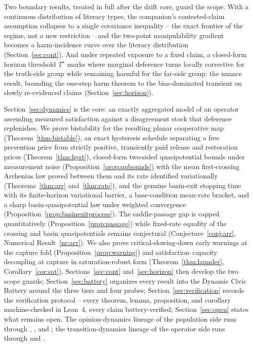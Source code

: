 \documentclass[11pt]{article}
\theoremstyle{definition}
\theoremstyle{remark}
\numberwithin{equation}{section}
\begin{document}
Two boundary results, treated in full after the drift core, guard the scope. With a continuous distribution of literacy types, the companion's contested-claim assumption collapses to a single covariance inequality -- the exact frontier of the regime, not a new restriction -- and the two-point manipulability gradient becomes a harm-incidence curve over the literacy distribution (Section~\ref{sec:cont}). And under repeated exposure to a fixed claim, a closed-form horizon threshold $T^\star$ marks where marginal deference turns locally corrective for the truth-side group while remaining harmful for the far-side group: the nuance result, bounding the one-step harm theorem to the bias-dominated transient on slowly re-evidenced claims (Section~\ref{sec:horizon}).

Section~\ref{sec:dynamics} is the core: an exactly aggregated model of an operator ascending measured satisfaction against a disagreement stock that deference replenishes. We prove bistability for the resulting planar cooperative map (Theorem~\ref{thm:bistable}), an exact hysteresis schedule separating a free prevention price from strictly positive, transiently paid release and restoration prices (Theorem~\ref{thm:hyst}), closed-form two-sided quasipotential bounds under measurement noise (Proposition~\ref{prop:qpbounds}) with the mean first-crossing Arrhenius law proved between them and its rate identified variationally (Theorems~\ref{thm:arr} and~\ref{thm:rate}), and the genuine basin-exit stopping time with its finite-horizon variational barrier, a base-condition mean-rate bracket, and a sharp basin-quasipotential law under weighted convergence (Proposition~\ref{prop:basinexitprocess}). The saddle-passage gap is capped quantitatively (Proposition~\ref{prop:passage}) while fixed-rate equality of the crossing and basin quasipotentials remains conjectural (Conjecture~\ref{conj:arr}, Numerical Result~\ref{nr:arr}). We also prove critical-slowing-down early warnings at the capture fold (Proposition~\ref{prop:warning}) and satisfaction--capacity decoupling at capture in saturation-robust form (Theorem~\ref{thm:launder}, Corollary~\ref{cor:sat}). Sections~\ref{sec:cont} and~\ref{sec:horizon} then develop the two scope guards; Section~\ref{sec:battery} organizes every result into the Dynamic Civic Battery around the three tiers and four probes; Section~\ref{sec:verification} records the verification protocol -- every theorem, lemma, proposition, and corollary machine-checked in Lean~4, every claim battery-verified; Section~\ref{sec:open} states what remains open. The opinion-dynamics lineage of the population side runs through \citet{degroot1974reaching}, \citet{friedkin1990social}, and \citet{golub2010naive}; the transition-dynamics lineage of the operator side runs through \citet{scheffer2009early} and \citet{dakos2008slowing}.
\end{document}
